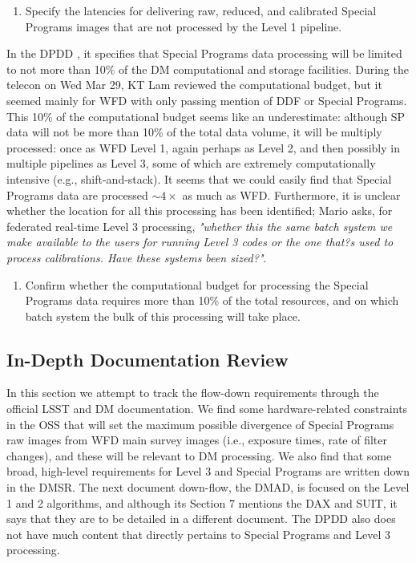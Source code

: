 \documentclass[DM,lsstdraft,toc]{lsstdoc}
\begin{document}
\begin{enumerate}[resume,topsep=-10pt,label= \textbf{Concern \Roman*.}] \item \label{C3} Specify the latencies for delivering raw, reduced, and calibrated Special Programs images that are not processed by the Level 1 pipeline. \end{enumerate}

In the DPDD \citep{LSE-163}, it specifies that Special Programs data processing will be limited to not more than 10\% of the DM computational and storage facilities. During the telecon on Wed Mar 29, KT Lam reviewed the computational budget, but it seemed mainly for WFD with only passing mention of DDF or Special Programs. This 10\% of the computational budget seems like an underestimate: although SP data will not be more than 10\% of the total data volume, it will be multiply processed: once as WFD Level 1, again perhaps as Level 2, and then possibly in multiple pipelines as Level 3, some of which are extremely computationally intensive (e.g., shift-and-stack). It seems that we could easily find that Special Programs data are processed $\sim4\times$ as much as WFD. Furthermore, it is unclear whether the location for all this processing has been identified; Mario asks, for federated real-time Level 3 processing, {\it "whether this the same batch system we make available to the users for running Level 3 codes or the one that?s used to process calibrations. Have these systems been sized?"}.

\begin{enumerate}[resume,topsep=-10pt,label= \textbf{Concern \Roman*.}] \item \label{C4} Confirm whether the computational budget for processing the Special Programs data requires more than 10\% of the total resources, and on which batch system the bulk of this processing will take place. \end{enumerate}



\subsection{In-Depth Documentation Review}\label{ssec:dmdocs_review}

In this section we attempt to track the flow-down requirements through the official LSST and DM documentation. We find some hardware-related constraints in the OSS that will set the maximum possible divergence of Special Programs raw images from WFD main survey images (i.e., exposure times, rate of filter changes), and these will be relevant to DM processing. We also find that some broad, high-level requirements for Level 3 and Special Programs are written down in the DMSR. The next document down-flow, the DMAD, is focused on the Level 1 and 2 algorithms, and although its Section 7 mentions the DAX and SUIT, it says that they are to be detailed in a different document. The DPDD also does not have much content that directly pertains to Special Programs and Level 3 processing.
\end{document}
